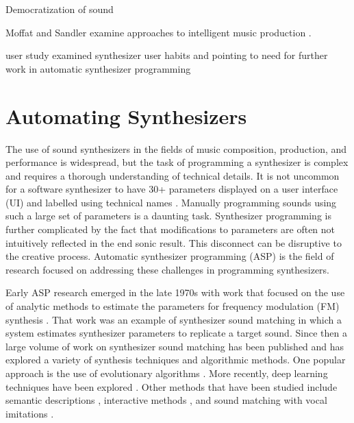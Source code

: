 Democratization of sound \cite{tavana2015democracy}

Moffat and Sandler examine approaches to intelligent music production \cite{moffat2019approaches}.

\cite{krekovic2019insights} user study examined synthesizer user habits and pointing to need for further work in automatic synthesizer programming

\section{Automating Synthesizers}
The use of sound synthesizers in the fields of music composition, production, and performance is widespread, but the task of programming a synthesizer is complex and requires a thorough understanding of technical details. It is not uncommon for a software synthesizer to have 30+ parameters displayed on a user interface (UI) and labelled using technical names \cite{rasmussen2018evaluating}. Manually programming sounds using such a large set of parameters is a daunting task. Synthesizer programming is further complicated by the fact that modifications to parameters are often not intuitively reflected in the end sonic result. This disconnect can be disruptive to the creative process. Automatic synthesizer programming (ASP) is the field of research focused on addressing these challenges in programming synthesizers.

 Early ASP research emerged in the late 1970s with work that focused on the use of analytic methods to estimate the parameters for frequency modulation (FM) synthesis \cite{justice1979analytic}. That work was an example of synthesizer sound matching in which a system estimates synthesizer parameters to replicate a target sound. Since then a large volume of work on synthesizer sound matching has been published and has explored a variety of synthesis techniques and algorithmic methods. One popular approach is the use of evolutionary algorithms \cite{horner1993machine, mitchell2007evolutionary, yee2007evolving, yee2008synthbot, heise2009automatic, roth2011comparison, tatar2016automatic, smith2017play}. More recently, deep learning techniques have been explored \cite{yee2018automatic, barkan2019inversynth, esling2020flow}. Other methods that have been studied include semantic descriptions \cite{ethington1994seawave, johnson2006timbre, krekovic2016algorithm}, interactive methods \cite{johnson1999exploring, dahlstedt2001creating, yee2016use}, and sound matching with vocal imitations \cite{mcartwright2014, zhang2018visualization}.
 
